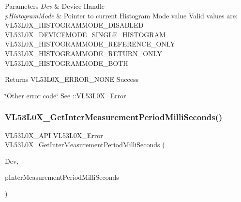 \begin{DoxyParams}{Parameters}
{\em Dev} & Device Handle \\
\hline
{\em p\+Histogram\+Mode} & Pointer to current Histogram Mode value Valid values are\+: V\+L53\+L0\+X\+\_\+\+H\+I\+S\+T\+O\+G\+R\+A\+M\+M\+O\+D\+E\+\_\+\+D\+I\+S\+A\+B\+L\+ED V\+L53\+L0\+X\+\_\+\+D\+E\+V\+I\+C\+E\+M\+O\+D\+E\+\_\+\+S\+I\+N\+G\+L\+E\+\_\+\+H\+I\+S\+T\+O\+G\+R\+AM V\+L53\+L0\+X\+\_\+\+H\+I\+S\+T\+O\+G\+R\+A\+M\+M\+O\+D\+E\+\_\+\+R\+E\+F\+E\+R\+E\+N\+C\+E\+\_\+\+O\+N\+LY V\+L53\+L0\+X\+\_\+\+H\+I\+S\+T\+O\+G\+R\+A\+M\+M\+O\+D\+E\+\_\+\+R\+E\+T\+U\+R\+N\+\_\+\+O\+N\+LY V\+L53\+L0\+X\+\_\+\+H\+I\+S\+T\+O\+G\+R\+A\+M\+M\+O\+D\+E\+\_\+\+B\+O\+TH \\
\hline
\end{DoxyParams}
\begin{DoxyReturn}{Returns}
V\+L53\+L0\+X\+\_\+\+E\+R\+R\+O\+R\+\_\+\+N\+O\+NE Success 

\char`\"{}\+Other error code\char`\"{} See \+::\+V\+L53\+L0\+X\+\_\+\+Error 
\end{DoxyReturn}
\mbox{\label{group__VL53L0X__parameters__group_ga409fed78170c0ff606a125e514351324}} 
\subsubsection{\texorpdfstring{V\+L53\+L0\+X\+\_\+\+Get\+Inter\+Measurement\+Period\+Milli\+Seconds()}{VL53L0X\_GetInterMeasurementPeriodMilliSeconds()}}
{\footnotesize\ttfamily V\+L53\+L0\+X\+\_\+\+A\+PI V\+L53\+L0\+X\+\_\+\+Error V\+L53\+L0\+X\+\_\+\+Get\+Inter\+Measurement\+Period\+Milli\+Seconds (\begin{DoxyParamCaption}\item[{\hyperlink{group__VL53L0X__platform__group_ga2d6405308b1dd524b462f1b8fb97d167}{V\+L53\+L0\+X\+\_\+\+D\+EV}}]{Dev,  }\item[{\hyperlink{vl53l0x__types_8h_a435d1572bf3f880d55459d9805097f62}{uint32\+\_\+t} $\ast$}]{p\+Inter\+Measurement\+Period\+Milli\+Seconds }\end{DoxyParamCaption})}

